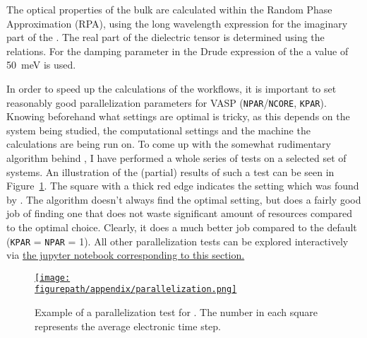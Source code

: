 \begin{refsection}
The optical properties of the bulk are calculated within the Random Phase 
Approximation (RPA), using the long wavelength expression for the imaginary 
part of the . The real part of the dielectric tensor is 
determined using the  relations. For the damping parameter in 
the Drude expression of the  a value of 50~\si{\milli\electronvolt} is used.

\pagebreak[4]

In order to speed up the calculations of the workflows, it is important to set 
reasonably good parallelization parameters for VASP 
(\texttt{NPAR}/\texttt{NCORE}, \texttt{KPAR}). Knowing beforehand what settings 
are optimal is tricky, as this depends on the system being studied, the 
computational settings and the machine the calculations are being run on. To 
come up with the somewhat rudimentary algorithm behind 
,
I have performed a whole series of tests on a selected set of systems. An 
illustration of the (partial) results of such a test can be seen in 
Figure~\ref{appendix:fig-parallelization}. The square with a thick red edge indicates the setting 
which was found by
. 
The algorithm doesn't always find the optimal setting, but does a fairly good 
job of finding one that does not waste significant amount of resources compared 
to the optimal choice. Clearly, it does a much better job compared to the default
(\texttt{KPAR} = \texttt{NPAR} = 1). All other parallelization tests can be 
explored interactively via \href{https://mybinder.org/v2/gh/mbercx/jupyter/master?filepath=parallel\%2Fparallel_analysis.ipynb}{the jupyter notebook corresponding 
to this section.}

\begin{figure}[ht]
\centering
\href{https://www.youtube.com/watch?v=q8rcTvAoRzk}{
\texttt{[image: \\figurepath/appendix/parallelization.png]}
}
\caption{Example of a parallelization test for . The number in each 
square represents the average electronic time step.}
\label{appendix:fig-parallelization}
\end{figure}
 
\pagebreak[4]


\end{refsection}
